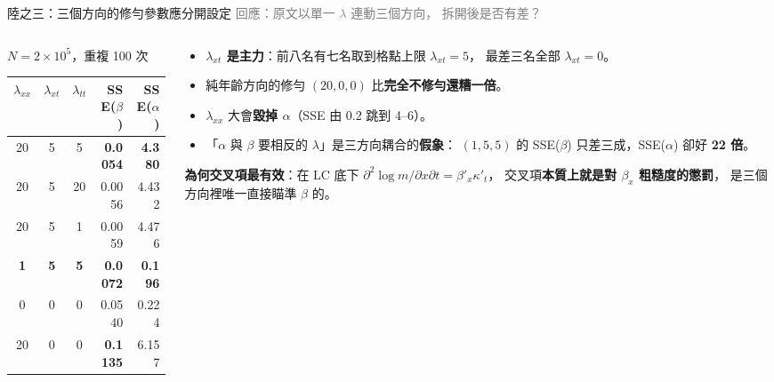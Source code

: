 \documentclass[aspectratio=169, UTF8, fontset=macnew, 11pt]{ctexbeamer}
\newcommand{\hi}[1]{\textcolor{red!70!black}{\textbf{#1}}}
\newcommand{\gd}[1]{\textcolor{green!45!black}{\textbf{#1}}}
\begin{document}
\begin{frame}{陸之三：三個方向的修勻參數應分開設定}
\footnotesize\textcolor{gray}{回應：原文以單一 $\lambda$ 連動三個方向，
拆開後是否有差？}\normalsize
\vspace{2pt}
\begin{columns}[T]
\begin{column}{0.52\textwidth}
\centering\small
$N=2\times10^5$，重複 100 次
\vspace{3pt}
\begin{tabular}{cccrr}
\toprule
$\lambda_{xx}$ & $\lambda_{xt}$ & $\lambda_{tt}$ & SSE($\beta$) & SSE($\alpha$)\\
\midrule
20 & 5 & 5  & \gd{0.0054} & \hi{4.380}\\
20 & 5 & 20 & 0.0056 & 4.432\\
20 & 5 & 1  & 0.0059 & 4.476\\
\gd{1} & \gd{5} & \gd{5} & \gd{0.0072} & \gd{0.196}\\
0  & 0 & 0  & 0.0540 & 0.224\\
20 & 0 & 0  & \hi{0.1135} & 6.157\\
\bottomrule
\end{tabular}
\end{column}
\begin{column}{0.46\textwidth}
\begin{itemize}\footnotesize
  \item \hi{$\lambda_{xt}$ 是主力}：前八名有七名取到格點上限 $\lambda_{xt}=5$，
        最差三名全部 $\lambda_{xt}=0$。
  \item 純年齡方向的修勻 $(20,0,0)$ 比\textbf{完全不修勻還糟一倍}。
  \item $\lambda_{xx}$ 大會\textbf{毀掉 $\alpha$}（SSE 由 0.2 跳到 4--6）。
  \item 「$\alpha$ 與 $\beta$ 要相反的 $\lambda$」是三方向耦合的\textbf{假象}：
        $(1,5,5)$ 的 SSE($\beta$) 只差三成，SSE($\alpha$) 卻好 \gd{22 倍}。
\end{itemize}
\vspace{4pt}
\footnotesize
\textbf{為何交叉項最有效}：在 LC 底下
$\partial^2\log m/\partial x\partial t=\beta'_x\kappa'_t$，
交叉項\textbf{本質上就是對 $\beta_x$ 粗糙度的懲罰}，
是三個方向裡唯一直接瞄準 $\beta$ 的。
\end{column}
\end{columns}
\end{frame}
\end{document}
